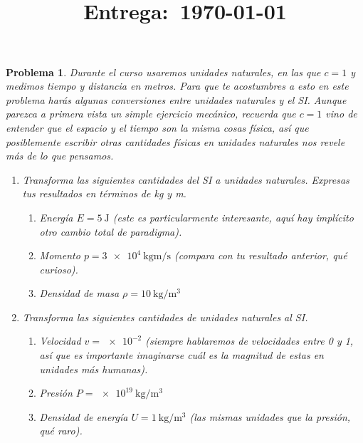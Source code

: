 \documentclass[12pt]{article}
\title{
    \textbf{\homeworknumber}\\
    \normalsize\vspace{0.1in}\small{\textbf{Entrega}:~\today}
    \vspace{-1.5in}
}
\author{}
\date{}
\theoremstyle{break}
\newtheorem{exercise}{Problema}
\theoremstyle{nonumberbreak}
\begin{document}
    \maketitle
    \thispagestyle{fancy}
    
    
    \begin{exercise}
        Durante el curso usaremos unidades naturales, en las que \(c = 1\) y medimos tiempo y distancia en metros. Para que te acostumbres a esto en este problema harás algunas conversiones entre unidades naturales y el SI. Aunque parezca a primera vista un simple ejercicio mecánico, recuerda que \(c = 1\) vino de entender que el espacio y el tiempo son la misma cosas física, así que posiblemente escribir otras cantidades físicas en unidades naturales nos revele más de lo que pensamos.

        \begin{enumerate}[label = \alph*)]
            \item Transforma las siguientes cantidades del SI a unidades naturales. Expresas tus resultados en términos de kg y m.
            
            \begin{enumerate}[label = \arabic*.]
                \item Energía \(E = \SI{5}{\joule}\) (este es particularmente interesante, aquí hay implícito otro cambio total de paradigma).
                \item Momento \(p = \SI[per-mode = power]{3e4}{\kilogram \metre \per\second}\) (compara con tu resultado anterior, qué curioso).
                \item Densidad de masa \(\rho = \SI[per-mode = power]{10}{\kilogram \per \cubic\metre}\)
            \end{enumerate}

            \item Transforma las siguientes cantidades de unidades naturales al SI.
            
            \begin{enumerate}[label = \arabic*.]
                \item Velocidad \(v = \num{e-2}\) (siempre hablaremos de velocidades entre 0 y 1, así que es importante imaginarse cuál es la magnitud de estas en unidades más humanas).
                \item Presión \(P = \SI[per-mode = power]{e19}{\kilogram \per \cubic\metre}\)
                \item Densidad de energía \(U = \SI[per-mode = power]{1}{\kilogram \per \cubic\metre}\) (las mismas unidades que la presión, qué raro).
            \end{enumerate}


\end{enumerate}
\end{exercise}
\end{document}

